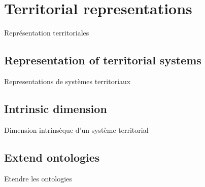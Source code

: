 \section{Territorial representations}{Représentation territoriales}





\subsection{Representation of territorial systems}{Representations de systèmes territoriaux}



\subsection{Intrinsic dimension}{Dimension intrinsèque d'un système territorial}



\subsection{Extend ontologies}{Etendre les ontologies}








